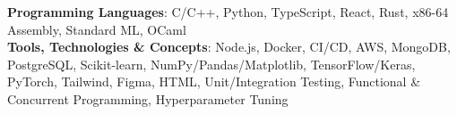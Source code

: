 
\begin{itemize}[leftmargin=0in, label={}]
  \scriptsize{
    \item{
      \textbf{Programming Languages}{: C/C++, Python, TypeScript, React, Rust, x86-64 Assembly, Standard ML, OCaml} \\
      \textbf{Tools, Technologies \& Concepts}{: Node.js, Docker, CI/CD, AWS, MongoDB, PostgreSQL, Scikit-learn, NumPy/Pandas/Matplotlib, TensorFlow/Keras, PyTorch, Tailwind, Figma, HTML, Unit/Integration Testing, Functional \& Concurrent Programming, Hyperparameter Tuning}
    }
  }
\end{itemize}